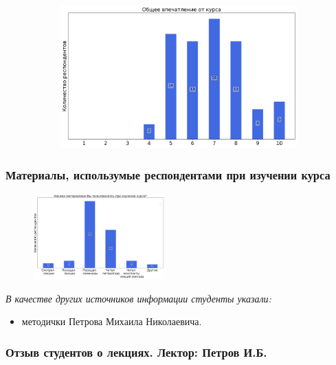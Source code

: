 		\begin{figure}[H]
			\centering
			\begin{subfigure}[b]{0.45\textwidth}
				\centering
				\includegraphics[width=\textwidth]{images/3 course/Вычислительная математика/general-0.png}
			\end{subfigure}
		\end{figure}

	\subsubsection{Материалы, использумые респондентами при изучении курса}

		\begin{figure}[H]
			\centering
			\includegraphics[width = 0.45\textwidth]{images/3 course/Вычислительная математика/materials.png}
		\end{figure}

		\textit{В качестве других источников информации студенты указали:} 
		\begin{itemize}
			\item методички Петрова Михаила Николаевича.
		\end{itemize}

	\subsubsection{Отзыв студентов о лекциях. Лектор: Петров И.Б.}

